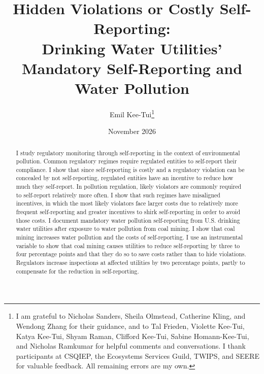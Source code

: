 \documentclass[12pt]{article}
\begin{document}
\title{Hidden Violations or Costly Self-Reporting:\\ Drinking Water Utilities' Mandatory Self-Reporting and Water Pollution}
\author{Emil Kee-Tui\thanks{%
I am grateful to Nicholas Sanders, Sheila Olmstead, Catherine Kling, and Wendong Zhang for their guidance, and to
Tal Frieden, Violette Kee-Tui, Katya Kee-Tui, Shyam Raman, Clifford Kee-Tui, Sabine Homann-Kee-Tui, and Nicholas Ramkumar for helpful comments and conversations. I thank participants at CSQIEP, the Ecosystems Services Guild, TWIPS, and SEERE for valuable feedback. All remaining errors are my own.}}
    
\date{November 2026}
\maketitle
\thispagestyle{empty}
\singlespacing

\vspace{-3.6em}
\begin{center}\begin{abstract}
		\noindent I study regulatory monitoring through self-reporting in the context of environmental pollution. Common regulatory regimes require regulated entities to self-report their compliance. I show that since self-reporting is costly and a regulatory violation can be concealed by not self-reporting, regulated entities have an incentive to reduce how much they self-report. In pollution regulation, likely violators are commonly required to self-report relatively more often. I show that such regimes have misaligned incentives, in which the most likely violators face larger costs due to relatively more frequent self-reporting and greater incentives to shirk self-reporting in order to avoid those costs. I document mandatory water pollution self-reporting from U.S. drinking water utilities after exposure to water pollution from coal mining. I show that coal mining increases water pollution and the costs of self-reporting. I use an instrumental variable to show that coal mining causes utilities to reduce self-reporting by three to four percentage points and that they do so to save costs rather than to hide violations. Regulators increase inspections at affected utilities by two percentage points, partly to compensate for the reduction in self-reporting.

\end{abstract}\end{center}
\end{document}
